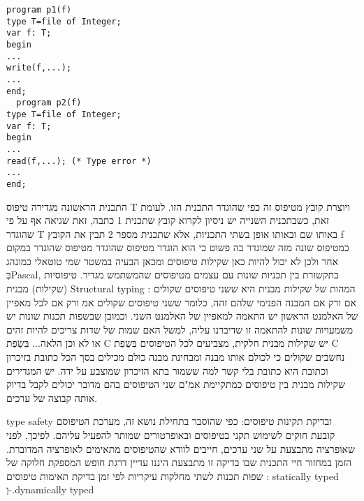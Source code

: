 \begin{טבלא}[!htbp]
\begin{verbatim}
program p1(f)
type T=file of Integer;
var f: T;
begin
...
write(f,...);
...
end;
  program p2(f)
type T=file of Integer;
var f: T;
begin
...
read(f,...); (* Type error *)
...
end;
\end{verbatim}

      התכנית הראשונה מגדירה טיפוס T ויוצרת קובץ מטיפוס זה כפי שהוגדר התכנית הזו.
      לעומת זאת, כשבתכנית השנייה יש ניסיון לקרוא קובץ שתכנית 1 כתבה, זאת שגיאה אף על
      פי שהוגדר T באותו שם ובאותו אופן בשתי התכניות, אלא שתכנית מספר 2 תבין את הקובץ
      f כמטיפוס שונה מזה שמוגדר בה פשוט כי הוא הוגדר מטיפוס שהוגדר מטיפוס שהוגדר
      במקום אחר ולכן לא יכול להיות כאן שקילות טיפוסים ומכאן הבעיה במשטר שמי טוטאלי
      כמונהג בְּPascal, בתקשורת בין תכניות שונות עם עצמים מטיפוסים שהמשתמש מגדיר.
      טיפוסיות (שקילות) מבנית Structural typing :
      המהות של שקילות מבנית היא ששני טיפוסים שקולים אם ורק אם המבנה הפנימי שלהם זהה, כלומר ששני טיפוסים שקולים אמ ורק אם לכל מאפיין של האלמנט הראשון יש התאמה למאפיין של האלמנט השני. וכמובן שבשפות תכנות שונות יש משמעויות שונות להתאמה זו שדיברנו עליה, למשל האם שמות של שדות צריכים להיות זהים או לא וכן הלאה...
      בִּשְׂפַת C יש שקילות מבנית חלקית, מצביעים לכל הטיפוסים בִּשְׂפַת C נחשבים שקולים כי לכולם אותו מבנה ומבחינת מבנה כולם מכילים בסך הכל כתובת בזיכרון וכתובת היא כתובת בלי קשר למה ששמור בתא הזיכרון שמוצבע על ידה.
      יש המגדירים שקילות מבנית בין טיפוסים כמתקיימת אמ"ם שני הטיפוסים בהם מדובר יכולים לקבל בדיוק אותה קבוצה של ערכים.

      type safety ובדיקת תקינות טיפוסים:
      כפי שהוסבר בתחילת נושא זה, מערכת הטיפוסם קובעת חוקים לשימוש תקני בטיפוסים ובאופרטורים שמותר להפעיל עליהם. לפיכך, לפני שאופרציה מתבצעת על שני ערכים, חייבים לוודא שהטיפוסים מתאימים לאופרציה המדוברת. הזמן במחזור חיי התכנית שבו בדיקה זו מתבצעת היננו עדיין דרגת חופש המספקת חלוקה של שפות תכנות לשתי מחלקות עיקריות לפי זמן בדיקת תאימות טיפוסים : statically typed וְ-.dynamically typed


\end{טבלא}
